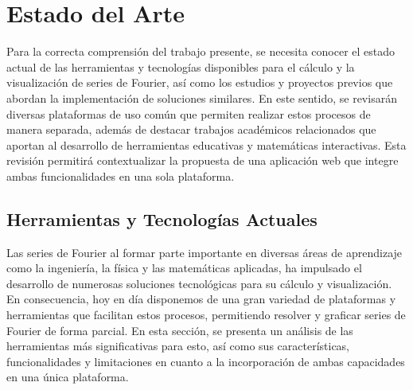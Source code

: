 \chapter{Estado del Arte}\label{ch:Estado del Arte}
Para la correcta comprensión del trabajo presente, se necesita conocer el estado actual de las herramientas y tecnologías disponibles para el cálculo y la visualización de series de Fourier, así como los estudios y proyectos previos que abordan la implementación de soluciones similares. En este sentido, se revisarán diversas plataformas de uso común que permiten realizar estos procesos de manera separada, además de destacar trabajos académicos relacionados que aportan al desarrollo de herramientas educativas y matemáticas interactivas. Esta revisión permitirá contextualizar la propuesta de una aplicación web que integre ambas funcionalidades en una sola plataforma.

\section{Herramientas y Tecnologías Actuales}
Las series de Fourier al formar parte importante en diversas áreas de aprendizaje como la ingeniería, la física y las matemáticas aplicadas, ha impulsado el desarrollo de numerosas soluciones tecnológicas para su cálculo y visualización. En consecuencia, hoy en día disponemos de una gran variedad de plataformas y herramientas que facilitan estos procesos, permitiendo resolver y graficar series de Fourier de forma parcial. En esta sección, se presenta un análisis de las herramientas más significativas para esto, así como sus características, funcionalidades y limitaciones en cuanto a la  incorporación de ambas capacidades en una única plataforma.

